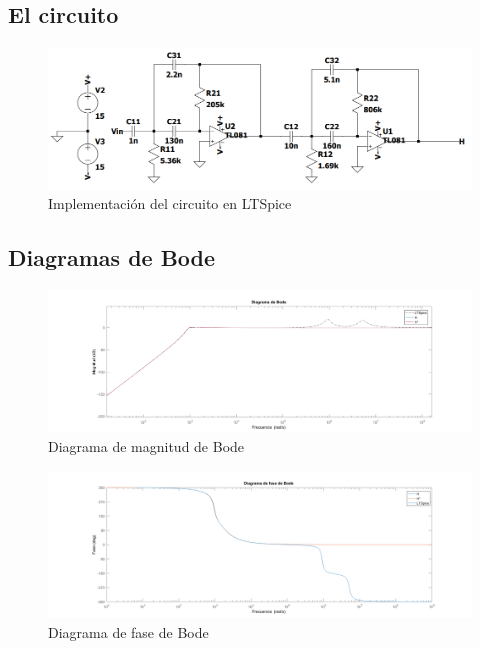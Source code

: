 \subsection{El circuito}
\begin{figure}[H]
    \centering
    \includegraphics[width=1\textwidth]{resources/Circuito.PNG}
    \caption{Implementación del circuito en LTSpice}
\end{figure}

\subsection{Diagramas de Bode}
\begin{figure}[H]
    \centering
    \includegraphics[width=1\textwidth]{resources/Bode_LTSpice.png}
    \caption{Diagrama de magnitud de Bode}
\end{figure}

\begin{figure}[H]
    \centering
    \includegraphics[width=1\textwidth]{resources/BodeFase_LTSpice.png}
    \caption{Diagrama de fase de Bode}
\end{figure}

